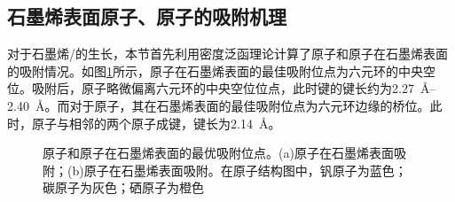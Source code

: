     \subsection{石墨烯表面原子、原子的吸附机理}
    \label{cap:VS}
    对于石墨烯/的生长，本节首先利用密度泛函理论计算了原子和原子在石墨烯表面的吸附情况。如图\ref{fig:VS_VandSeOnG}所示，原子在石墨烯表面的最佳吸附位点为六元环的中央空位。吸附后，原子略微偏离六元环的中央空位位点，此时键的键长约为\SIrange[range-phrase=$\sim$]{2.27}{2.40}{\angstrom}。而对于原子，其在石墨烯表面的最佳吸附位点为六元环边缘的桥位。此时，原子与相邻的两个原子成键，键长为\SI{2.14}{\angstrom}。

    \begin{figure}[htb]
        \caption{原子和原子在石墨烯表面的最优吸附位点。(a)原子在石墨烯表面吸附；(b)原子在石墨烯表面吸附。在原子结构图中，钒原子为蓝色；碳原子为灰色；硒原子为橙色}
        \label{fig:VS_VandSeOnG}
    \end{figure}

